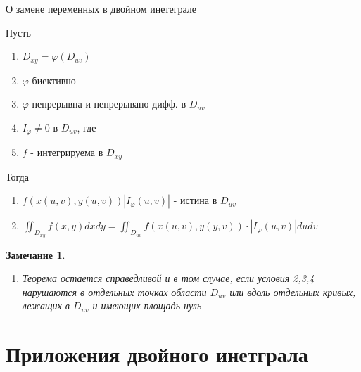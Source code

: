 \documentclass[a4paper, 14pt]{report}
\newtheorem{note}{Замечание}[chapter]
\begin{document}
\begin{theorem}
    О замене переменных в двойном инетеграле

    Пусть

    \begin{enumerate}
        \item $D_{xy} = \varphi(D_{uv})$
        \item $\varphi$ биективно
        \item $\varphi$ непрерывна и непрерывано дифф. в $D_{uv}$
        \item $I_\varphi \ne 0$ в $D_{uv}$, где 
        \item $f$ - интегрируема в $D_{xy}$
    \end{enumerate}
    
    Тогда

    \begin{enumerate}
        \item $f(x(u,v), y(u,v)) |I_\varphi (u,v)|$ - истина в $D_{uv}$
        \item $\iint_{D_{xy}} f(x,y) dxdy = \iint_{D_{uv}} f(x(u,v), y(y,v)) \cdot |I_\varphi (u,v)| dudv$
    \end{enumerate}
\end{theorem}

\begin{note}
    \begin{enumerate}
        \item Теорема остается справедливой и в том случае, если условия 2,3,4 нарушаются в отдельных точках области $D_{uv}$ или вдоль отдельных кривых, лежащих в $D_{uv}$ и имеющих площадь нуль
    \end{enumerate}
\end{note}

\section{Приложения двойного инетграла}
\end{document}
